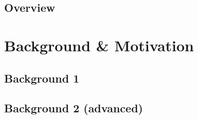 




\frontmatter %


\pagestyle{pagenum.scrheadings}












\mainmatter%


\setchapterpreamble[u]{\margintoc}
\chapter{Overview}\label{chap:overview}



\part{Background \& Motivation}\label{part:background}

\setchapterpreamble[u]{\margintoc}
\chapter{Background 1}\label{chap:background-1}


\setchapterpreamble[u]{\margintoc}
\chapter{Background 2 (advanced)}\label{chap:background-2}


